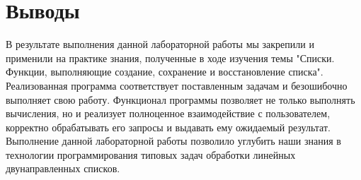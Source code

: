 \section*{Выводы}

В результате выполнения данной лабораторной работы мы закрепили и применили на практике знания,
полученные в ходе изучения темы
"Списки.
Функции, выполняющие создание, сохранение и восстановление списка".
Реализованная программа соответствует поставленным задачам и безошибочно выполняет свою работу.
Функционал программы позволяет не только выполнять вычисления, но и реализует полноценное взаимодействие
с пользователем, корректно обрабатывать его запросы и выдавать ему
ожидаемый результат.
Выполнение данной лабораторной работы позволило
углубить наши знания в технологии программирования типовых
задач обработки линейных
двунаправленных списков.